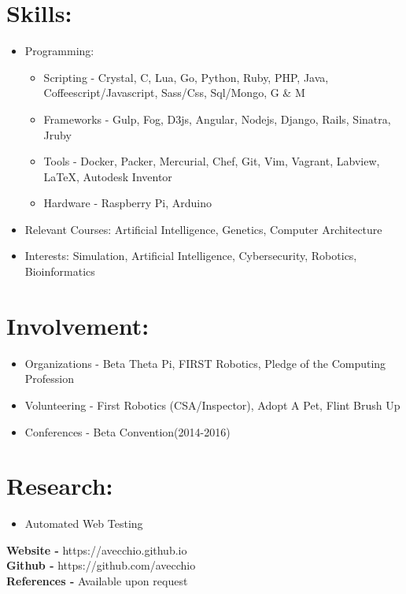 \documentclass{res}
\begin{document}
\section{Skills:}
\begin{itemize}[leftmargin=*]
\item Programming:
\begin{itemize}[label=$\circ$]
\item Scripting - Crystal, C, Lua, Go, Python, Ruby, PHP, Java, Coffeescript/Javascript, Sass/Css, Sql/Mongo, G \& M
\item Frameworks - Gulp, Fog, D3js, Angular, Nodejs, Django, Rails, Sinatra, Jruby
\item Tools - Docker, Packer, Mercurial, Chef, Git, Vim, Vagrant, Labview, \LaTeX, Autodesk Inventor
\item Hardware - Raspberry Pi, Arduino
\end{itemize}
\item Relevant Courses: Artificial Intelligence, Genetics, Computer Architecture
\item Interests: Simulation, Artificial Intelligence, Cybersecurity, Robotics, Bioinformatics
\end{itemize}

\section{Involvement:}
\begin{itemize}[leftmargin=*]
\item Organizations - Beta Theta Pi, FIRST Robotics, Pledge of the Computing Profession
\item Volunteering - First Robotics (CSA/Inspector), Adopt A Pet, Flint Brush Up
\item Conferences - Beta Convention(2014-2016)%
\end{itemize}

\section{Research:}
\begin{itemize}[leftmargin=*]
\item Automated Web Testing
\end{itemize}

\begin{center}
\textbf{Website - }https://avecchio.github.io\\
\textbf{Github - }https://github.com/avecchio\\
\textbf{References - }Available upon request
\end{center}
\end{document}
